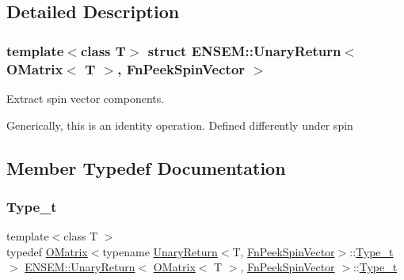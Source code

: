 \subsection{Detailed Description}
\subsubsection*{template$<$class T$>$\newline
struct E\+N\+S\+E\+M\+::\+Unary\+Return$<$ O\+Matrix$<$ T $>$, Fn\+Peek\+Spin\+Vector $>$}

Extract spin vector components. 

Generically, this is an identity operation. Defined differently under spin 

\subsection{Member Typedef Documentation}
\mbox{\label{structENSEM_1_1UnaryReturn_3_01OMatrix_3_01T_01_4_00_01FnPeekSpinVector_01_4_a995bd2c849af30377b0fa17937b63f19}} 
\subsubsection{\texorpdfstring{Type\_t}{Type\_t}\hspace{0.1cm}{\footnotesize\ttfamily [1/3]}}
{\footnotesize\ttfamily template$<$class T $>$ \\
typedef \mbox{\hyperlink{classENSEM_1_1OMatrix}{O\+Matrix}}$<$typename \mbox{\hyperlink{structENSEM_1_1UnaryReturn}{Unary\+Return}}$<$T, \mbox{\hyperlink{structENSEM_1_1FnPeekSpinVector}{Fn\+Peek\+Spin\+Vector}}$>$\+::\mbox{\hyperlink{structENSEM_1_1UnaryReturn_3_01OMatrix_3_01T_01_4_00_01FnPeekSpinVector_01_4_a995bd2c849af30377b0fa17937b63f19}{Type\+\_\+t}}$>$ \mbox{\hyperlink{structENSEM_1_1UnaryReturn}{E\+N\+S\+E\+M\+::\+Unary\+Return}}$<$ \mbox{\hyperlink{classENSEM_1_1OMatrix}{O\+Matrix}}$<$ T $>$, \mbox{\hyperlink{structENSEM_1_1FnPeekSpinVector}{Fn\+Peek\+Spin\+Vector}} $>$\+::\mbox{\hyperlink{structENSEM_1_1UnaryReturn_3_01OMatrix_3_01T_01_4_00_01FnPeekSpinVector_01_4_a995bd2c849af30377b0fa17937b63f19}{Type\+\_\+t}}}

